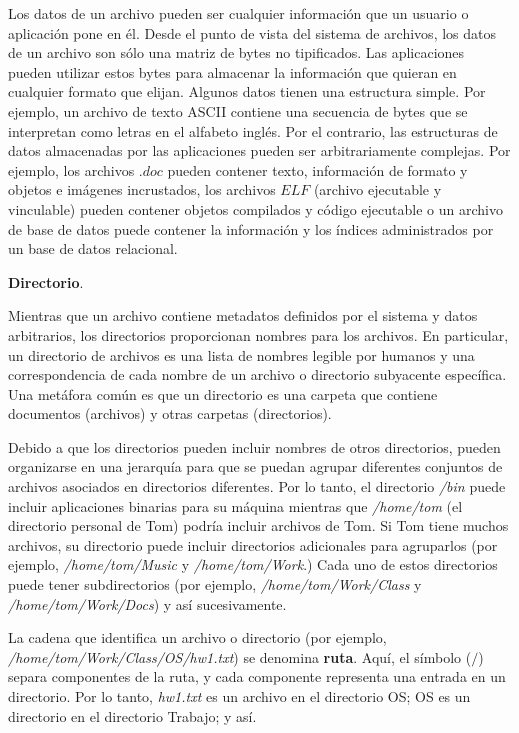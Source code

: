 \documentclass[10pt]{book}
\begin{document}
Los datos de un archivo pueden ser cualquier información que un usuario o aplicación pone en él. Desde el punto de vista del sistema de archivos, los datos de un archivo son sólo una matriz de bytes no tipificados. Las aplicaciones pueden utilizar estos bytes para almacenar la información que quieran en cualquier formato que elijan. Algunos datos tienen una estructura simple. Por ejemplo, un archivo de texto ASCII contiene una secuencia de bytes que se interpretan como letras en el alfabeto inglés. Por el contrario, las estructuras de datos almacenadas por las aplicaciones pueden ser arbitrariamente complejas. Por ejemplo, los archivos $.doc$ pueden contener texto, información de formato y objetos e imágenes incrustados, los archivos $ELF$ (archivo ejecutable y vinculable) pueden contener objetos compilados y código ejecutable o un archivo de base de datos puede contener la información y los índices administrados por un base de datos relacional.

\textbf{Directorio}. 

Mientras que un archivo contiene metadatos definidos por el sistema y datos arbitrarios, los directorios proporcionan nombres para los archivos. En particular, un directorio de archivos es una lista de nombres legible por humanos y una correspondencia de cada nombre de un archivo o directorio subyacente específica. Una metáfora común es que un directorio es una carpeta que contiene documentos (archivos) y otras carpetas (directorios).

Debido a que los directorios pueden incluir nombres de otros directorios, pueden organizarse en una jerarquía para que se puedan agrupar diferentes conjuntos de archivos asociados en directorios diferentes. Por lo tanto, el directorio \textit{/bin} puede incluir aplicaciones binarias para su máquina mientras que \textit{/home/tom} (el directorio personal de Tom) podría incluir archivos de Tom. Si Tom tiene muchos archivos, su directorio puede incluir directorios adicionales para agruparlos (por ejemplo, \textit{/home/tom/Music} y \textit{/home/tom/Work}.) Cada uno de estos directorios puede tener subdirectorios (por ejemplo, \textit{/home/tom/Work/Class} y \textit{/home/tom/Work/Docs}) y así sucesivamente.

La cadena que identifica un archivo o directorio (por ejemplo, \textit{/home/tom/Work/Class/OS/hw1.txt}) se denomina \textbf{ruta}. Aquí, el símbolo ($/$) separa componentes de la ruta, y cada componente representa una entrada en un directorio. Por lo tanto, \textit{hw1.txt} es un archivo en el directorio OS; OS es un directorio en el directorio Trabajo; y así.
\end{document}
